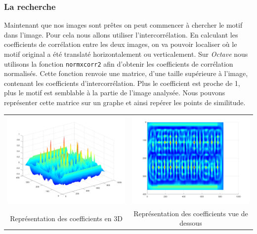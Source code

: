 \documentclass[a4paper,12pt,titlepage]{report}
\newcommand{\octave}{\textit{Octave }}
\begin{document}
		\subsubsection{La recherche}
		Maintenant que nos images sont prêtes on peut commencer à chercher le motif dans l'image. Pour cela nous allons utiliser l'intercorrélation. En calculant les coefficients de corrélation entre les deux images, on va pouvoir localiser où le motif original a été translaté horizontalement ou verticalement.
		Sur \octave nous utilisons la fonction \texttt{normxcorr2} afin d'obtenir les coefficients de corrélation normalisés. Cette fonction renvoie une matrice, d'une taille supérieure à l'image, contenant les coefficients d'intercorrélation. Plus le coefficient est proche de 1, plus le motif est semblable à la partie de l'image analysée.
		Nous pouvons représenter cette matrice sur un graphe et ainsi repérer les points de similitude.
		
		\begin{center}
			\begin{tabular}{cc}
				\includegraphics[scale=0.19]{../illus/cor.png} & \includegraphics[scale=0.19]{../illus/cor1.png}\\
				Représentation des coefficients en 3D  & Représentation des coefficients vue de dessous\\
			\end{tabular}
		\end{center}
		
\end{document}
